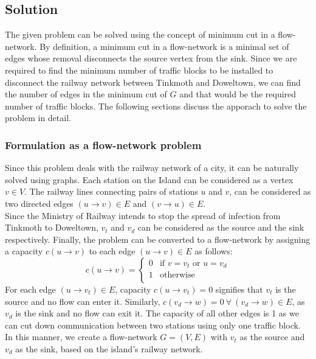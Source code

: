 \documentclass[12pt]{report}
\begin{document}
    \subsection*{Solution}
    The given problem can be solved using the concept of minimum cut in a flow-network.
    By definition, a minimum cut in a flow-network is a minimal set of edges whose removal disconnects the source vertex from the sink.
    Since we are required to find the minimum number of traffic blocks to be installed to disconnect the railway network between Tinkmoth and Doweltown,
    we can find the number of edges in the minimum cut of $G$ and that would be the required number of traffic blocks.
    The following sections discuss the apporach to solve the problem in detail.
    \vfill

    \subsubsection*{Formulation as a flow-network problem}
    Since this problem deals with the railway network of a city, it can be naturally solved using graphs.
    Each station on the Island can be considered as a vertex $v \in V$.
    The railway lines connecting pairs of stations $u$ and $v$, can be considered as two directed edges $(u \to v) \in E$ and $(v \to u) \in E$. \\
    Since the Ministry of Railway intends to stop the spread of infection from Tinkmoth to Doweltown, $v_{t}$ and $v_{d}$
    can be considered as the source and the sink respectively.
    Finally, the problem can be converted to a flow-network by assigning a capacity $c(u \to v)$ to each edge $(u \to v) \in E$ as follows:
    \begin{equation}
        \label{eq:capacity}
        c(u \to v) = \begin{cases}
            0 & \text{if $v = v_{t}$ or $u = v_{d}$} \\
            1 & \text{otherwise} \\
        \end{cases}
    \end{equation}
    For each edge $(u \to v_{t}) \in E$, capacity $c(u \to v_{t}) = 0$ signifies that $v_{t}$ is the source and no flow can enter it.
    Similarly, $c(v_{d} \to w) = 0 \ \forall \ (v_{d} \to w) \in E$, as $v_{d}$ is the sink and no flow can exit it.
    The capacity of all other edges is 1 as we can cut down communication between two stations using only one traffic block. \\
    In this manner, we create a flow-network $G = (V, E)$ with $v_{t}$ as the source and $v_{d}$ as the sink, based on the island's railway network.
\end{document}
